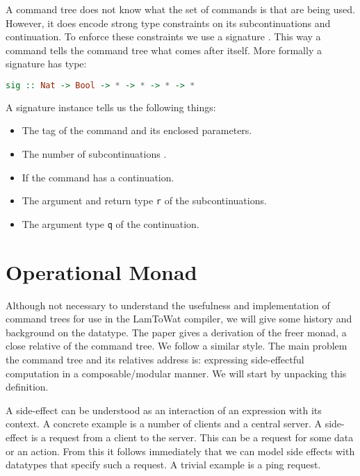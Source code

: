 A command tree does not know what the set of commands is that are being used. However, it does encode strong type constraints on its subcontinuations and continuation. To enforce these constraints we use a signature . This way a command tells the command tree what comes after itself. More formally a signature has type:

\begin{lstlisting}[language=Haskell]
sig :: Nat -> Bool -> * -> * -> * -> *
\end{lstlisting}

A signature instance  tells us the following things:

\begin{itemize}
\item The tag of the command and its enclosed parameters.
\item The number of subcontinuations .
\item If the command has a continuation.
\item The argument  and return type \lstinline{r} of the subcontinuations.
\item The argument type \lstinline{q} of the continuation.
\end{itemize}

\section{\label{opmonad}Operational Monad}
Although not necessary to understand the usefulness and implementation of command trees for use in the LamToWat compiler, we will give some history and background on the datatype. The paper  gives a derivation of the freer monad, a close relative of the command tree. We follow a similar style. The main problem the command tree and its relatives address is: expressing side-effectful computation in a composable/modular manner. We will start by unpacking this definition.

A side-effect can be understood as an interaction of an expression with its context\autocite{DBLP:conf/tacs/CartwrightF94}. A concrete example is a number of clients and a central server. A side-effect is a request from a client to the server. This can be a request for some data or an action. From this it follows immediately that we can model side effects with datatypes that specify such a request. A trivial example is a ping request.

